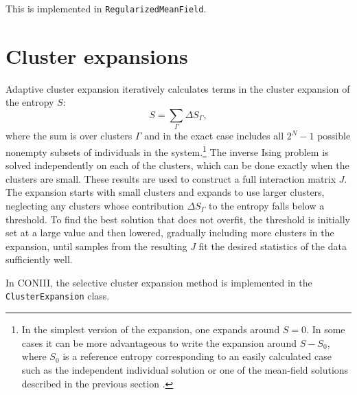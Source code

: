 \documentclass[aps,prl,twocolumn,nofootinbib]{revtex4-1}
\begin{document}
This is implemented in {\tt RegularizedMeanField}.



\section{Cluster expansions}

Adaptive cluster expansion \cite{Monasson:2011fo,CocMon12,BarCoc13}
iteratively calculates terms in the
cluster expansion of the entropy $S$:
\begin{equation}
S = \sum_\Gamma \Delta S_\Gamma,
\end{equation}
where the sum is over clusters $\Gamma$ and in the exact case
includes all $2^N - 1$ possible nonempty subsets of individuals in the system.\footnote{In the simplest version of the expansion,
one expands around $S=0$.  In some cases it can be more advantageous to write the
expansion around $S-S_0$, where $S_0$ is a reference entropy corresponding to
an easily calculated case such as
the independent individual solution or one of the mean-field solutions
described in the previous section \cite{BarCoc13}.}
The inverse Ising problem is solved independently
on each of the clusters, which can be done exactly when the
clusters are small.  These results are used to construct a full
interaction matrix $J$.
The expansion starts with small clusters and expands to use larger
clusters, neglecting any clusters whose
contribution $\Delta S_\Gamma$ to the entropy falls below a threshold.
To find the best solution that does not overfit,
the threshold is initially set at a large value and then lowered,
gradually including more clusters in the expansion, until samples from
the resulting $J$ fit the desired statistics of the data sufficiently well.

In CONIII, the selective cluster expansion method is implemented in the {\tt ClusterExpansion} class.


\end{document}
